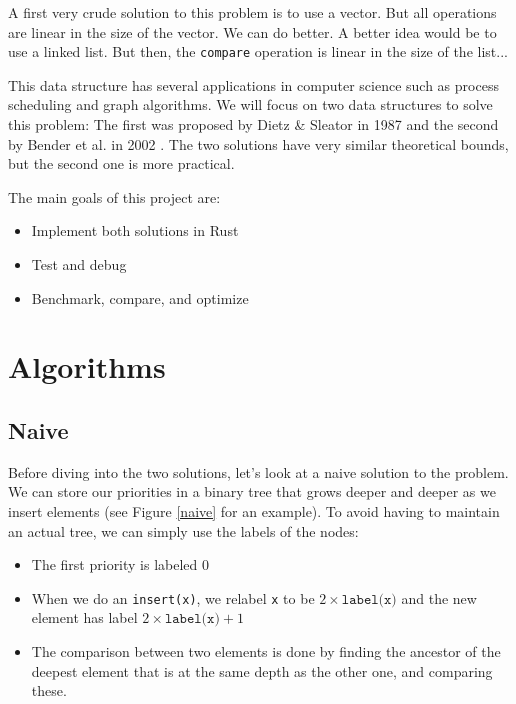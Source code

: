 \documentclass[12pt]{article}
\begin{document}
A first very crude solution to this problem is to use a vector. But all operations are linear in the size of the vector. We can do better.
A better idea would be to use a linked list. But then, the \texttt{compare} operation is linear in the size of the list...

This data structure has several applications in computer science such as process scheduling and graph algorithms.
We will focus on two data structures to solve this problem: The first was proposed by Dietz \& Sleator in 1987 \cite{10.1145/28395.28434} and the second by Bender et al. in 2002 \cite{10.5555/647912.740822}.
The two solutions have very similar theoretical bounds, but the second one is more practical.

The main goals of this project are:
\begin{itemize}
    \item Implement both solutions in Rust
    \item Test and debug
    \item Benchmark, compare, and optimize
\end{itemize}

\newpage
\section{Algorithms}

\subsection{Naive}

Before diving into the two solutions, let's look at a naive solution to the problem.
We can store our priorities in a binary tree that grows deeper and deeper as we insert elements (see Figure \ref{naive} for an example).
To avoid having to maintain an actual tree, we can simply use the labels of the nodes:
\begin{itemize}
    \item The first priority is labeled 0
    \item When we do an \texttt{insert(x)}, we relabel \texttt{x} to be $2 \times \texttt{label(x)}$ and the new element has label $2 \times \texttt{label(x)} + 1$
    \item The comparison between two elements is done by finding the ancestor of the deepest element that is at the same depth as the other one, and comparing these.
\end{itemize}
\end{document}
